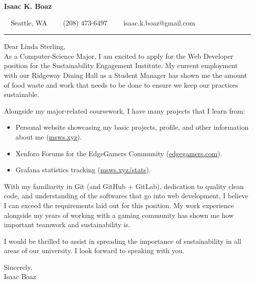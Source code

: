 \documentclass[10pt,letterpaper]{article}
\newenvironment{indentsection}[1]%
{\begin{list}{}%
	{\setlength{\leftmargin}{#1}}%
	\item[]%
}
{\end{list}}
\begin{document}
\begin{center}
    \vspace*{-2.5em}
    {\LARGE \textbf{Isaac K. Boaz}}

    \ \ Seattle, WA\ \ \textbullet
    \ \ (208) 473-6497\ \ \textbullet
    \ \ isaac.k.boaz@gmail.com
\end{center}

\hrule
\vspace{0.8em}

\begin{indentsection}{\parindent}
    Dear Linda Sterling, \\[1em]
    \indent\indent As a Computer-Science Major, I am excited to apply for the Web Developer position for the Sustainability Engagement Institute.
    My current employment with our Ridgeway Dining Hall as a Student Manager has shown me the amount of food waste and work that needs to be done to ensure we keep our practices sustainable.

    \indent\indent Alongside my major-related coursework, I have many projects that I learn from:
    \begin{itemize}
        \item Personal website showcasing my basic projects, profile, and other information about me (\href{https://msws.xyz}{msws.xyz}).
        \item Xenforo Forums for the EdgeGamers Community (\href{https://edgegamers.com}{edgegamers.com}).
        \item Grafana statistics tracking (\href{https://msws.xyz/stats}{msws.xyz/stats}).
    \end{itemize}

    With my familiarity in Git (and GitHub + GitLab), dedication to quality clean code, and understanding of the softwares that go into web development,
    I believe I can exceed the requirements laid out for this position. My work experience alongside my years of working with a gaming community has
    shown me how important teamwork and sustainability is.

    I would be thrilled to assist in spreading the importance of sustainability in all areas of our university. I look forward to speaking with you.

    Sincerely, \\
    Isaac Boaz
\end{indentsection}
\end{document}

